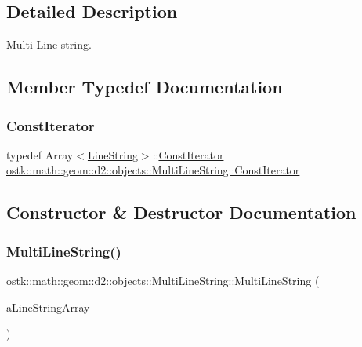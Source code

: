 \subsection{Detailed Description}
Multi Line string. 

\subsection{Member Typedef Documentation}
\mbox{\label{classostk_1_1math_1_1geom_1_1d2_1_1objects_1_1_multi_line_string_a43dc9419e5743d8a920141ba4fa10c5f}} 
\subsubsection{\texorpdfstring{Const\+Iterator}{ConstIterator}}
{\footnotesize\ttfamily typedef Array$<$\hyperlink{classostk_1_1math_1_1geom_1_1d2_1_1objects_1_1_line_string}{Line\+String}$>$\+::\hyperlink{classostk_1_1math_1_1geom_1_1d2_1_1objects_1_1_multi_line_string_a43dc9419e5743d8a920141ba4fa10c5f}{Const\+Iterator} \hyperlink{classostk_1_1math_1_1geom_1_1d2_1_1objects_1_1_multi_line_string_a43dc9419e5743d8a920141ba4fa10c5f}{ostk\+::math\+::geom\+::d2\+::objects\+::\+Multi\+Line\+String\+::\+Const\+Iterator}}



\subsection{Constructor \& Destructor Documentation}
\mbox{\label{classostk_1_1math_1_1geom_1_1d2_1_1objects_1_1_multi_line_string_a5a30febbcbc28097e34b6f2f3f456b79}} 
\subsubsection{\texorpdfstring{Multi\+Line\+String()}{MultiLineString()}}
{\footnotesize\ttfamily ostk\+::math\+::geom\+::d2\+::objects\+::\+Multi\+Line\+String\+::\+Multi\+Line\+String (\begin{DoxyParamCaption}\item[{const Array$<$ \hyperlink{classostk_1_1math_1_1geom_1_1d2_1_1objects_1_1_line_string}{Line\+String} $>$ \&}]{a\+Line\+String\+Array }\end{DoxyParamCaption})}



